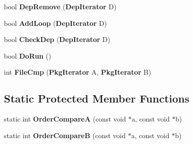\begin{DoxyCompactItemize}
\item 
bool {\bfseries \-Dep\-Remove} ({\bf \-Dep\-Iterator} \-D)\label{classpkgOrderList_a31f72b9d3f94d17b50d3249a0d34817b}

\item 
bool {\bfseries \-Add\-Loop} ({\bf \-Dep\-Iterator} \-D)\label{classpkgOrderList_a3795b38184558ddcd0775c7f5890699c}

\item 
bool {\bfseries \-Check\-Dep} ({\bf \-Dep\-Iterator} \-D)\label{classpkgOrderList_a431684d7b10de2e0db854d69cffb6ae4}

\item 
bool {\bfseries \-Do\-Run} ()\label{classpkgOrderList_a7783f09e6e50f9ce19dde00d2d91a558}

\item 
int {\bfseries \-File\-Cmp} ({\bf \-Pkg\-Iterator} \-A, {\bf \-Pkg\-Iterator} \-B)\label{classpkgOrderList_aa416e86374849b5fe42d9afd8b581203}

\end{DoxyCompactItemize}
\subsection*{\-Static \-Protected \-Member \-Functions}
\begin{DoxyCompactItemize}
\item 
static int {\bfseries \-Order\-Compare\-A} (const void $\ast$a, const void $\ast$b)\label{classpkgOrderList_a6ea1b6ffb3da455207f502be67df927d}

\item 
static int {\bfseries \-Order\-Compare\-B} (const void $\ast$a, const void $\ast$b)\label{classpkgOrderList_a2a42e7014f46b0e3f7d55b8650138109}

\end{DoxyCompactItemize}
